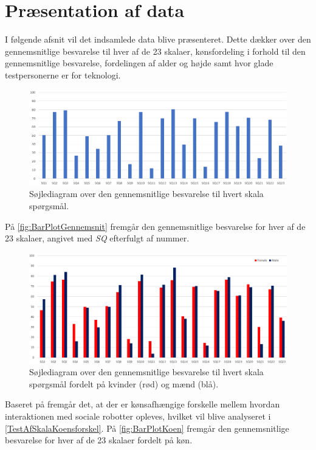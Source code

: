 \section{Præsentation af data}
\label{TestAfSkalaPraesentationAfData}
%
I følgende afsnit vil det indsamlede data blive præsenteret. Dette dækker over den gennemsnitlige besvarelse til hver af de 23 skalaer, kønsfordeling i forhold til den gennemsnitlige besvarelse, fordelingen af alder og højde samt hvor glade testpersonerne er for teknologi. 
%
\begin{figure}[H]
\centering
\includegraphics[width = \textwidth]{Figure/DatabehandlingSkalaer/BarPlotRaaData} 
\caption{Søjlediagram over den gennemsnitlige besvarelse til hvert skala spørgsmål.}
\label{fig:BarPlotGennemsnit}
\end{figure}
\noindent
%
På \autoref{fig:BarPlotGennemsnit} fremgår den gennemsnitlige besvarelse for hver af de 23 skalaer, angivet med \textit{SQ} efterfulgt af nummer.
%
\begin{figure}[H]
\centering
\includegraphics[width = \textwidth]{Figure/DatabehandlingSkalaer/KoenGennemnitligBesvarelser} 
\caption{Søjlediagram over den gennemsnitlige besvarelse til hvert skala spørgsmål fordelt på kvinder (rød) og mænd (blå).}
\label{fig:BarPlotKoen}
\end{figure}
\noindent
%
Baseret på  fremgår det, at der er kønsafhængige forskelle mellem hvordan interaktionen med sociale robotter opleves, hvilket vil blive analyseret i \autoref{TestAfSkalaKoensforskel}. På \autoref{fig:BarPlotKoen} fremgår den gennemsnitlige besvarelse for hver af de 23 skalaer fordelt på køn.    
